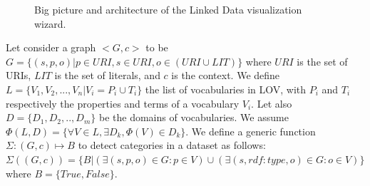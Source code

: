 \begin{figure}[!htbp]
\begin{center}


\caption{Big picture and architecture of the Linked Data visualization wizard.}
\label{fig:workflow}
\end{center}
\end{figure}

Let consider a graph $<G,c>$ to be $G=\{(s,p,o)| p \in URI, s \in URI, o \in (URI \cup LIT)\} $ where $URI$ is the set of URIs, $LIT$ is the set of literals, and $c$ is the context. We define $L=\{V_{1}, V_{2}, ...,V_{n} | V_{i}=P_{i} \cup T_{i}\} $ the list of vocabularies in LOV, with $P_{i}$ and $T_{i}$ respectively the properties and terms of a vocabulary $V_{i}$. Let also $D=\{D_{1}, D_{2}, ..,D_{m} \} $ be the domains of vocabularies. We assume $\Phi(L,D) =\{ \forall V \in L, \exists D_{k}, \Phi(V) \in D_{k} \} $. We define a generic function $\Sigma:(G,c)\mapsto B $ to detect categories in a dataset as follows: $\Sigma((G,c))=\{B| ( \exists(s,p,o) \in G: p \in V) \cup (\exists(s, rdf:type,o) \in G: o \in V)\} $ where $B =\{True, False\} $.


